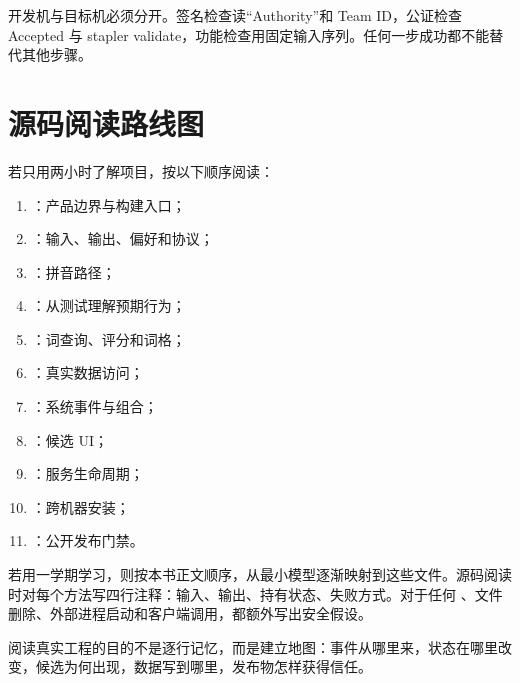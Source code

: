 开发机与目标机必须分开。签名检查读“Authority”和 Team ID，公证检查 Accepted 与 stapler validate，功能检查用固定输入序列。任何一步成功都不能替代其他步骤。


\chapter{源码阅读路线图}

若只用两小时了解项目，按以下顺序阅读：

\begin{enumerate}
  \item {}：产品边界与构建入口；
  \item {}：输入、输出、偏好和协议；
  \item {}：拼音路径；
  \item {}：从测试理解预期行为；
  \item {}：词查询、评分和词格；
  \item {}：真实数据访问；
  \item {}：系统事件与组合；
  \item {}：候选 UI；
  \item {}：服务生命周期；
  \item {}：跨机器安装；
  \item {}：公开发布门禁。
\end{enumerate}

若用一学期学习，则按本书正文顺序，从最小模型逐渐映射到这些文件。源码阅读时对每个方法写四行注释：输入、输出、持有状态、失败方式。对于任何 、文件删除、外部进程启动和客户端调用，都额外写出安全假设。

\begin{summarybox}
阅读真实工程的目的不是逐行记忆，而是建立地图：事件从哪里来，状态在哪里改变，候选为何出现，数据写到哪里，发布物怎样获得信任。
\end{summarybox}
